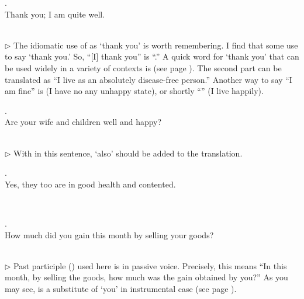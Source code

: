 \medskip
\parbox[lt]{0.93\linewidth}{\raggedright{}. \\
\hspace*{6mm}Thank you; I am quite well.}\\[1mm]
{\small $\triangleright$ The idiomatic use of  as `thank you' is worth remembering. I find that some use  to say `thank you.' So, ``[I] thank you'' is ``.'' A quick word for `thank you' that can be used widely in a variety of contexts is  (see page \pageref{nip:saadhu}). The second part can be translated as ``I live as an absolutely disease-free person.'' Another way to say ``I am fine'' is  (I have no any unhappy state), or shortly ``'' (I live happily).}

\medskip
\parbox[lt]{0.93\linewidth}{\raggedright{}. \\
\hspace*{6mm}Are your wife and children well and happy?}\\[1mm]
{\small $\triangleright$ With  in this sentence, `also' should be added to the translation.}

\medskip
\parbox[lt]{0.93\linewidth}{\raggedright{}. \\
\hspace*{6mm}Yes, they too are in good health and contented.}\\[1mm]

\medskip
\parbox[lt]{0.93\linewidth}{\raggedright{}. \\
\hspace*{6mm}How much did you gain this month by selling your goods?}\\[1mm]
{\small $\triangleright$ Past participle () used here is in passive voice. Precisely, this means ``In this month, by selling the goods, how much was the gain obtained by you?'' As you may see,  is a substitute of `you' in instrumental case (see page \pageref{decl:bhavanta}).}

